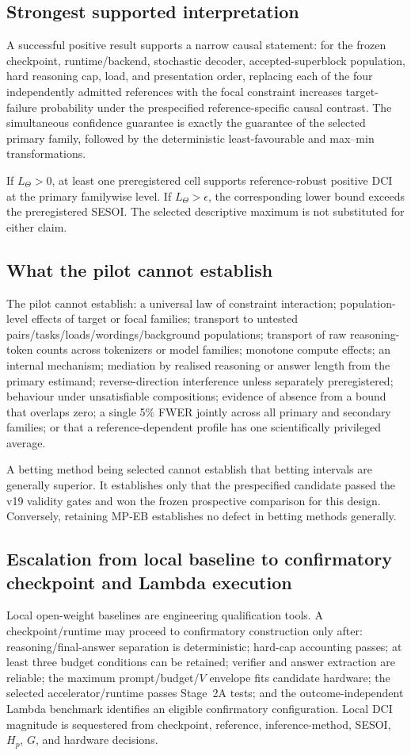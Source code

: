 \documentclass[11pt,a4paper]{article}
\begin{document}
\subsection{Strongest supported interpretation}
A successful positive result supports a narrow causal statement: for the frozen checkpoint, runtime/backend, stochastic decoder, accepted-superblock population, hard reasoning cap, load, and presentation order, replacing each of the four independently admitted references with the focal constraint increases target-failure probability under the prespecified reference-specific causal contrast. The simultaneous confidence guarantee is exactly the guarantee of the selected primary family, followed by the deterministic least-favourable and max--min transformations.

If $L_\Theta>0$, at least one preregistered cell supports reference-robust positive DCI at the primary familywise level. If $L_\Theta>\epsilon$, the corresponding lower bound exceeds the preregistered SESOI. The selected descriptive maximum is not substituted for either claim.

\subsection{What the pilot cannot establish}
The pilot cannot establish: a universal law of constraint interaction; population-level effects of target or focal families; transport to untested pairs/tasks/loads/wordings/background populations; transport of raw reasoning-token counts across tokenizers or model families; monotone compute effects; an internal mechanism; mediation by realised reasoning or answer length from the primary estimand; reverse-direction interference unless separately preregistered; behaviour under unsatisfiable compositions; evidence of absence from a bound that overlaps zero; a single 5\% FWER jointly across all primary and secondary families; or that a reference-dependent profile has one scientifically privileged average.

A betting method being selected cannot establish that betting intervals are generally superior. It establishes only that the prespecified candidate passed the v19 validity gates and won the frozen prospective comparison for this design. Conversely, retaining MP-EB establishes no defect in betting methods generally.

\subsection{Escalation from local baseline to confirmatory checkpoint and Lambda execution}
Local open-weight baselines are engineering qualification tools. A checkpoint/runtime may proceed to confirmatory construction only after: reasoning/final-answer separation is deterministic; hard-cap accounting passes; at least three budget conditions can be retained; verifier and answer extraction are reliable; the maximum prompt/budget/$V$ envelope fits candidate hardware; the selected accelerator/runtime passes Stage~2A tests; and the outcome-independent Lambda benchmark identifies an eligible confirmatory configuration. Local DCI magnitude is sequestered from checkpoint, reference, inference-method, SESOI, $H_p$, $G$, and hardware decisions.
\end{document}
